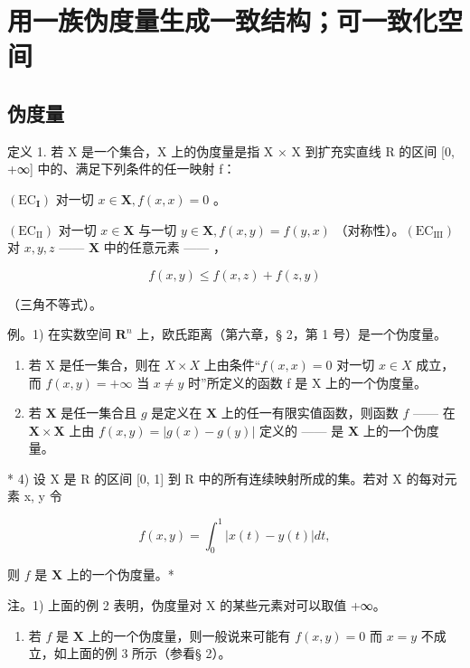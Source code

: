 \section{用一族伪度量生成一致结构；可一致化空间}

\subsection{伪度量}

定义 1. 若 X 是一个集合，X 上的伪度量是指 X × X 到扩充实直线 R 的区间 {[}0, +∞{]} 中的、满足下列条件的任一映射 f：

\((\mathrm{EC}_{\mathbf{I}})\) 对一切 \(x \in \mathbf{X}, f(x, x) = 0\) 。

\((\mathrm{EC}_{\mathrm{II}})\) 对一切 \(x \in \mathbf{X}\) 与一切 \(y \in \mathbf{X}, f(x, y) = f(y, x)\) （对称性）。\((\mathrm{EC}_{\mathrm{III}})\) 对 \(x, y, z\) —— \(\mathbf{X}\) 中的任意元素 —— ，

\[
f (x, y) \leqslant f (x, z) + f (z, y)
\]

（三角不等式）。

例。1) 在实数空间 \(\mathbf{R}^n\) 上，欧氏距离（第六章，§ 2，第 1 号）是一个伪度量。

\begin{enumerate}
\def\labelenumi{\arabic{enumi})}
\setcounter{enumi}{1}
\item
  若 X 是任一集合，则在 \(X \times X\) 上由条件“\(f(x, x) = 0\) 对一切 \(x \in X\) 成立，而 \(f(x, y) = +\infty\) 当 \(x \neq y\) 时”所定义的函数 f 是 X 上的一个伪度量。
\item
  若 \(\mathbf{X}\) 是任一集合且 \(g\) 是定义在 \(\mathbf{X}\) 上的任一有限实值函数，则函数 \(f\) —— 在 \(\mathbf{X} \times \mathbf{X}\) 上由 \(f(x, y) = |g(x) - g(y)|\) 定义的 —— 是 \(\mathbf{X}\) 上的一个伪度量。
\end{enumerate}

* 4) 设 X 是 R 的区间 {[}0, 1{]} 到 R 中的所有连续映射所成的集。若对 X 的每对元素 x, y 令

\[
f (x, y) = \int_ {0} ^ {1} | x (t) - y (t) | d t,
\]

则 \(f\) 是 \(\mathbf{X}\) 上的一个伪度量。*

注。1) 上面的例 2 表明，伪度量对 X 的某些元素对可以取值 +∞。

\begin{enumerate}
\def\labelenumi{\arabic{enumi})}
\setcounter{enumi}{1}
\tightlist
\item
  若 \(f\) 是 \(\mathbf{X}\) 上的一个伪度量，则一般说来可能有 \(f(x, y) = 0\) 而 \(x = y\) 不成立，如上面的例 3 所示（参看§ 2）。
\end{enumerate}

